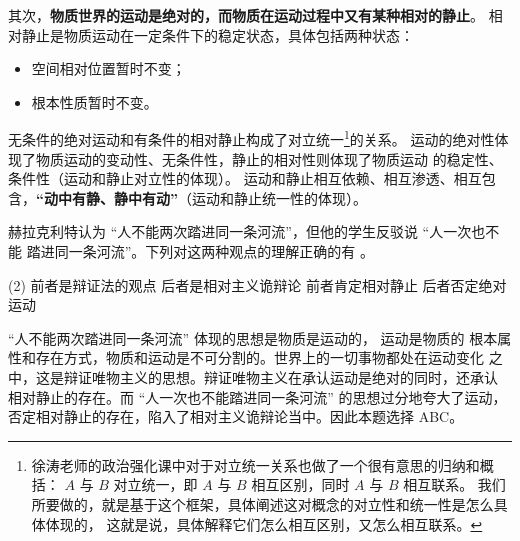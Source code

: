 \documentclass[11pt, UTF8]{book} %
\begin{document}
其次，\textbf{物质世界的运动是绝对的，而物质在运动过程中又有某种相对的静止}。
相对静止是物质运动在一定条件下的稳定状态，具体包括两种状态：
\begin{itemize}[itemsep=0pt]
    \item 空间相对位置暂时不变；
    \item 根本性质暂时不变。
\end{itemize}
无条件的绝对运动和有条件的相对静止构成了对立统一\footnote{
    徐涛老师的政治强化课中对于对立统一关系也做了一个很有意思的归纳和概括：
    $A$ 与 $B$ 对立统一，即 $A$ 与 $B$ 相互区别，同时 $A$ 与 $B$ 相互联系。
    我们所要做的，就是基于这个框架，具体阐述这对概念的对立性和统一性是怎么具体体现的，
    这就是说，具体解释它们怎么相互区别，又怎么相互联系。
}的关系。
运动的绝对性体现了物质运动的变动性、无条件性，静止的相对性则体现了物质运动
的稳定性、条件性（运动和静止对立性的体现）。
运动和静止相互依赖、相互渗透、相互包含，\textbf{“动中有静、静中有动”}（运动和静止统一性的体现）。
%         

\begin{example}
    赫拉克利特认为 “人不能两次踏进同一条河流”，但他的学生反驳说 “人一次也不能
    踏进同一条河流”。下列对这两种观点的理解正确的有 \underline{\qquad \qquad \qquad}。
    \begin{tasks}[label={\Alph*.}](2)
        \task 前者是辩证法的观点
        \task 后者是相对主义诡辩论
        \task 前者肯定相对静止
        \task 后者否定绝对运动
    \end{tasks}
    \begin{cmt}
        “人不能两次踏进同一条河流” 体现的思想是物质是运动的， 运动是物质的
        根本属性和存在方式，物质和运动是不可分割的。世界上的一切事物都处在运动变化
        之中，这是辩证唯物主义的思想。辩证唯物主义在承认运动是绝对的同时，还承认
        相对静止的存在。而 “人一次也不能踏进同一条河流” 的思想过分地夸大了运动，
        否定相对静止的存在，陷入了相对主义诡辩论当中。因此本题选择 ABC。
    \end{cmt}
\end{example}
\end{document}
